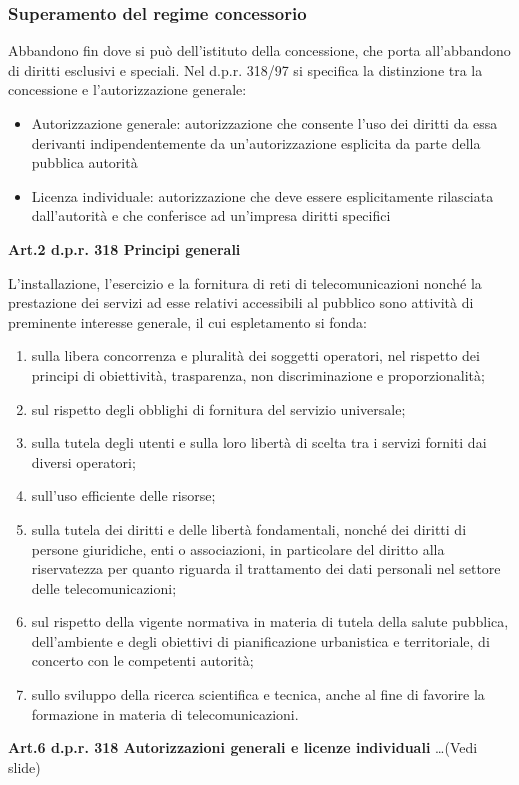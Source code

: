 \subsubsection{Superamento del regime concessorio}
Abbandono fin dove si può dell'istituto della concessione, che porta all'abbandono di diritti esclusivi e speciali. 
Nel d.p.r. 318/97 si specifica la distinzione tra la concessione e l'autorizzazione generale:
\begin{itemize}
    \item Autorizzazione generale: autorizzazione che consente l'uso dei diritti da essa derivanti indipendentemente da un'autorizzazione esplicita da parte della pubblica autorità
    \item Licenza individuale: autorizzazione che deve essere esplicitamente rilasciata dall'autorità e che conferisce ad un'impresa diritti specifici
\end{itemize}
	
\textbf{Art.2 d.p.r. 318 Principi generali} 

L'installazione, l'esercizio e la fornitura di reti di telecomunicazioni nonché la prestazione dei servizi ad esse relativi accessibili al pubblico sono attività di preminente interesse generale, il cui espletamento si fonda: 
\begin{enumerate}
    \item sulla libera concorrenza e pluralità dei soggetti operatori, nel rispetto dei principi di obiettività, trasparenza, non discriminazione e proporzionalità; 
    \item sul rispetto degli obblighi di fornitura del servizio universale; 
    \item sulla tutela degli utenti e sulla loro libertà di scelta tra i servizi forniti dai diversi operatori;
    \item sull'uso efficiente delle risorse;
    \item sulla tutela dei diritti e delle libertà fondamentali, nonché dei diritti di persone giuridiche, enti o associazioni, in particolare del diritto alla riservatezza per quanto riguarda il trattamento dei dati personali nel settore delle telecomunicazioni;
    \item sul rispetto della vigente normativa in materia di tutela della salute pubblica, dell'ambiente e degli obiettivi di pianificazione urbanistica e territoriale, di concerto con le competenti autorità;
    \item sullo sviluppo della ricerca scientifica e tecnica, anche al fine di favorire la formazione in materia di telecomunicazioni. 
\end{enumerate}

\textbf{Art.6 d.p.r. 318 Autorizzazioni generali e licenze individuali }
\dots (Vedi slide)


